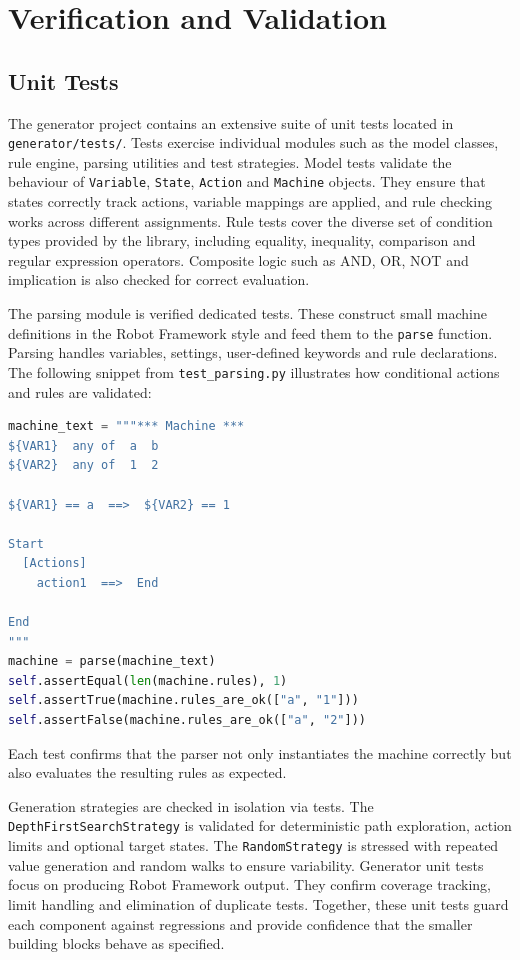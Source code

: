 \section{Verification and Validation}

\subsection{Unit Tests}

The generator project contains an extensive suite of unit tests located in
\texttt{generator/tests/}. Tests exercise individual
modules such as the model classes, rule engine, parsing utilities and test
strategies.  Model tests validate the behaviour of \texttt{Variable},
\texttt{State}, \texttt{Action} and \texttt{Machine} objects. They ensure that
states correctly track actions, variable mappings are applied, and rule checking
works across different assignments.  Rule tests cover the diverse set of
condition types provided by the library, including equality, inequality,
comparison and regular expression operators.  Composite logic such as AND, OR,
NOT and implication is also checked for correct evaluation.

The parsing module is verified dedicated tests. These construct small
machine definitions in the Robot Framework style and feed them to the
\texttt{parse} function. Parsing handles variables, settings, user-defined
keywords and rule declarations. The following snippet from
\texttt{test\_parsing.py} illustrates how conditional actions and rules are
validated:
\begin{lstlisting}[language=python]
machine_text = """*** Machine ***
${VAR1}  any of  a  b
${VAR2}  any of  1  2

${VAR1} == a  ==>  ${VAR2} == 1

Start
  [Actions]
    action1  ==>  End

End
"""
machine = parse(machine_text)
self.assertEqual(len(machine.rules), 1)
self.assertTrue(machine.rules_are_ok(["a", "1"]))
self.assertFalse(machine.rules_are_ok(["a", "2"]))
\end{lstlisting}
Each test confirms that the parser not only instantiates the machine correctly
but also evaluates the resulting rules as expected.

Generation strategies are checked in isolation via tests. The
\texttt{DepthFirstSearchStrategy} is validated for deterministic path
exploration, action limits and optional target states. The
\texttt{RandomStrategy} is stressed with repeated value generation and random
walks to ensure variability.  Generator unit tests focus on producing Robot
Framework output. They confirm coverage tracking, limit handling and elimination
of duplicate tests.  Together, these unit tests guard each component against
regressions and provide confidence that the smaller building blocks behave as
specified.


